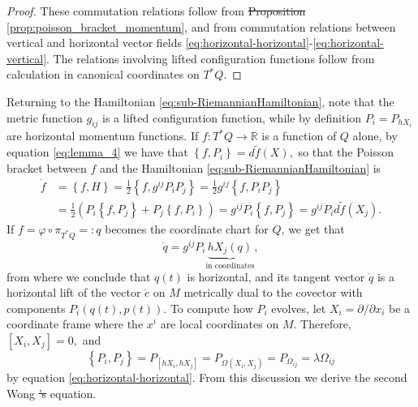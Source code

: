 \documentclass[12pt, letterpaper, reqno]{amsart}
\theoremstyle{definition}
\theoremstyle{plain}
\theoremstyle{remark}
\providecommand{\DIFadd}[1]{{\protect\color{blue}\uwave{#1}}} %
\providecommand{\DIFdel}[1]{{\protect\color{red}\sout{#1}}}                      %
\providecommand{\DIFaddbegin}{} %
\providecommand{\DIFaddend}{} %
\providecommand{\DIFdelbegin}{} %
\providecommand{\DIFdelend}{} %
\newcommand{\DIFscaledelfig}{0.5}
\newlength{\DIFdelgraphicswidth} %
\newlength{\DIFdelgraphicsheight} %
\newcommand{\DIFaddincludegraphics}[2][]{{\color{blue}\fbox{\DIFOincludegraphics[#1]{#2}}}} %
\newcommand{\DIFdelincludegraphics}[2][]{%
\sbox{\DIFdelgraphicsbox}{\DIFOincludegraphics[#1]{#2}}%
\settoboxwidth{\DIFdelgraphicswidth}{\DIFdelgraphicsbox} %
\settoboxtotalheight{\DIFdelgraphicsheight}{\DIFdelgraphicsbox} %
\scalebox{\DIFscaledelfig}{%
\parbox[b]{\DIFdelgraphicswidth}{\usebox{\DIFdelgraphicsbox}\\[-\baselineskip] \rule{\DIFdelgraphicswidth}{0em}}\llap{\resizebox{\DIFdelgraphicswidth}{\DIFdelgraphicsheight}{%
\setlength{\unitlength}{\DIFdelgraphicswidth}%
\begin{picture}(1,1)%
\thicklines\linethickness{2pt} %
{\color[rgb]{1,0,0}\put(0,0){\framebox(1,1){}}}%
{\color[rgb]{1,0,0}\put(0,0){\line( 1,1){1}}}%
{\color[rgb]{1,0,0}\put(0,1){\line(1,-1){1}}}%
\end{picture}%
}\hspace*{3pt}}} %
} %
\DeclareRobustCommand{\DIFaddbegin}{\DIFOaddbegin \let\includegraphics\DIFaddincludegraphics} %
\DeclareRobustCommand{\DIFaddend}{\DIFOaddend \let\includegraphics\DIFOincludegraphics} %
\DeclareRobustCommand{\DIFdelbegin}{\DIFOdelbegin \let\includegraphics\DIFdelincludegraphics} %
\DeclareRobustCommand{\DIFdelend}{\DIFOaddend \let\includegraphics\DIFOincludegraphics} %
\begin{document}
\begin{proof}
	These commutation relations follow from \DIFdelbegin \DIFdel{Proposition }\DIFdelend \DIFaddbegin \DIFadd{proposition }\DIFaddend \ref{prop:poisson_bracket_momentum}, and from commutation relations between vertical and horizontal vector fields \eqref{eq:horizontal-horizontal}-\eqref{eq:horizontal-vertical}. The relations involving lifted configuration functions follow from calculation in canonical coordinates on $ T^*Q. $ 
\end{proof}
Returning to the Hamiltonian \eqref{eq:sub-RiemannianHamiltonian}, note that the metric function $ g_{ij} $ is a lifted configuration function, while by definition $ P_i=P_{hX_i} $ are horizontal momentum functions. If $ f: T^*Q \rightarrow \mathbb{R} $ is a function of $ Q $ alone, by equation \eqref{eq:lemma_4} we have that $ \left\{ f, P_i \right\} = d\tilde f(X), $ so that the Poisson bracket between $ f $ and the Hamiltonian \eqref{eq:sub-RiemannianHamiltonian} is 
\begin{align*}
	\dot{f} &= \left\{ f, H \right\} = \frac{1}{2} \left\{ f, g^{ij}P_iP_j \right\} = \frac{1}{2} g^{ij} \left\{ f, P_iP_j \right\} \\&= \frac{1}{2} \left( P_i \left\{ f,P_j \right\} +P_j \left\{ f,P_i \right\}  \right) = g^{ij}P_i \left\{ f,P_j \right\} = g^{ij} P_i d\tilde f( X_j). 
\end{align*}
If $ f= \varphi\circ\pi_{T^*Q}=:q $ becomes the coordinate chart for $ Q $, we get that 
$$ \dot{q} = g^{ij}P_i \underbrace{hX_j(q)}_{\text{in coordinates}}, $$ 
from where we conclude that $ q(t) $ is horizontal, and its tangent vector $ \dot{q} $ is a horizontal lift of the vector $ \dot{c} $ on $ M $ metrically dual to the covector with components $ P_i(q(t), p(t)). $ To compute how $ P_i $ evolves, let $ X_i=\partial/\partial x_i $ be a coordinate frame where the $ x^i $ are local coordinates on $ M. $  Therefore, $ [X_i,X_j]=0, $ and
$$ \left\{ P_i,P_j \right\} = P_{[hX_i, hX_j]}= P_{\Omega(X_i, X_j)} = P_{\Omega_{ij}} = \lambda \Omega_{ij} $$ 
by equation \eqref{eq:horizontal-horizontal}. From this discussion we derive the second Wong \DIFdelbegin \DIFdel{'s }\DIFdelend equation.
\end{document}
